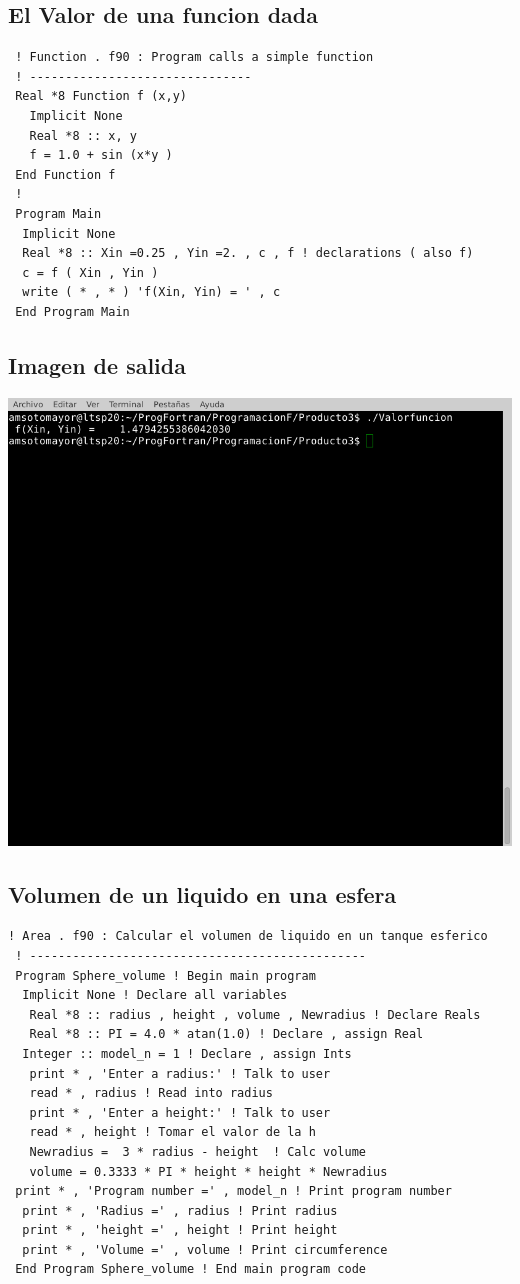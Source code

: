 \documentclass[letterpaper,10pt,twoside,onecolumn]{article}
\begin{document}
\subsection{El Valor de una funcion dada}
\begin{verbatim}
 ! Function . f90 : Program calls a simple function
 ! -------------------------------
 Real *8 Function f (x,y)
   Implicit None
   Real *8 :: x, y
   f = 1.0 + sin (x*y )
 End Function f
 !
 Program Main
  Implicit None 
  Real *8 :: Xin =0.25 , Yin =2. , c , f ! declarations ( also f)
  c = f ( Xin , Yin )
  write ( * , * ) 'f(Xin, Yin) = ' , c
 End Program Main 
\end{verbatim}
\subsection{Imagen de salida}
\includegraphics[scale=.75]{Valorfuncion.png}

\subsection{Volumen de un liquido en una esfera}
\begin{verbatim}
! Area . f90 : Calcular el volumen de liquido en un tanque esferico
 ! -----------------------------------------------
 Program Sphere_volume ! Begin main program
  Implicit None ! Declare all variables
   Real *8 :: radius , height , volume , Newradius ! Declare Reals
   Real *8 :: PI = 4.0 * atan(1.0) ! Declare , assign Real
  Integer :: model_n = 1 ! Declare , assign Ints
   print * , 'Enter a radius:' ! Talk to user
   read * , radius ! Read into radius
   print * , 'Enter a height:' ! Talk to user
   read * , height ! Tomar el valor de la h
   Newradius =  3 * radius - height  ! Calc volume
   volume = 0.3333 * PI * height * height * Newradius
 print * , 'Program number =' , model_n ! Print program number
  print * , 'Radius =' , radius ! Print radius
  print * , 'height =' , height ! Print height
  print * , 'Volume =' , volume ! Print circumference
 End Program Sphere_volume ! End main program code
\end{verbatim}
\end{document}
